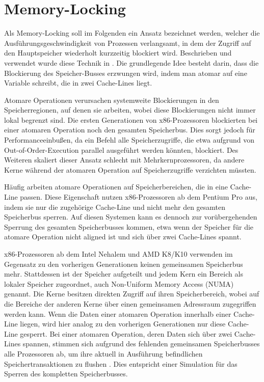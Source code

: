 

\section{Memory-Locking}
\label{MemoryLocking}

Als Memory-Locking soll im Folgenden ein Ansatz bezeichnet werden, welcher die Ausführungsgeschwindigkeit von Prozessen verlangsamt, in dem der Zugriff auf den Hauptspeicher wiederholt kurzzeitig blockiert wird.
Beschrieben und verwendet wurde diese Technik in \cite{MemoryLockingWu, MemoryLockingRisenpart, MemoryLockingJavaAndroid}.
Die grundlegende Idee besteht darin, dass die Blockierung des Speicher-Busses erzwungen wird, indem man atomar auf eine Variable schreibt, die in zwei Cache-Lines liegt.

Atomare Operationen verursachen systemweite Blockierungen in den Speicherregionen, auf denen sie arbeiten, wobei diese Blockierungen nicht immer lokal begrenzt sind.
Die ersten Generationen von x86-Prozessoren blockierten bei einer atomaren Operation noch den gesamten Speicherbus.
Dies sorgt jedoch für Performanceeinbußen, da ein Befehl alle Speicherzugriffe, die etwa aufgrund von Out-of-Order-Execution parallel ausgeführt werden könnten, blockiert.
Des Weiteren skaliert dieser Ansatz schlecht mit Mehrkernprozessoren, da andere Kerne während der atomaren Operation auf Speicherzugriffe verzichten müssten.

Häufig arbeiten atomare Operationen auf Speicherbereichen, die in eine Cache-Line passen. Diese Eigenschaft nutzen x86-Prozessoren ab dem Pentium Pro aus, indem sie nur die zugehörige Cache-Line und nicht mehr den gesamten Speicherbus sperren.
Auf diesen Systemen kann es dennoch zur vorübergehenden Sperrung des gesamten Speicherbusses kommen, etwa wenn der Speicher für die atomare Operation nicht 
aligned %
ist und sich über zwei Cache-Lines spannt.

x86-Prozessoren ab dem Intel Nehalem und AMD K8/K10 verwenden im Gegensatz zu den vorherigen Generationen keinen gemeinsamen Speicherbus mehr. Stattdessen ist der Speicher aufgeteilt und jedem Kern ein Bereich als lokaler Speicher zugeordnet, auch Non-Uniform Memory Access (NUMA) genannt. 
Die Kerne besitzen direkten Zugriff auf ihren Speicherbereich, wobei auf die Bereiche der anderen Kerne über einen gemeinsamen Adressraum zugegriffen werden kann.
Wenn die Daten einer atomaren Operation innerhalb einer Cache-Line liegen, wird hier analog zu den vorherigen Generationen nur diese Cache-Line gesperrt.
Bei einer atomaren Operation, deren Daten sich über zwei Cache-Lines spannen, stimmen sich aufgrund des fehlenden gemeinsamen Speicherbusses alle Prozessoren ab, um ihre aktuell in Ausführung befindlichen Speichertransaktionen zu flushen \cite{MemoryLockingWu}.
Dies entspricht einer Simulation für das Sperren des kompletten Speicherbusses.

